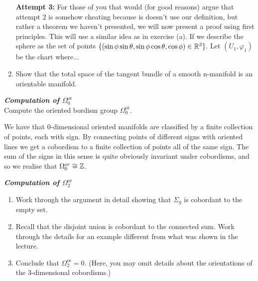 \begin{enumerate}[label=(\alph*)]
    \textbf{Attempt 3:} For those of you that would (for good reasons) argue that attempt 2 is somehow cheating because is doesn't use our definition, but rather a theorem we haven't presented, we will now present a proof using first principles. This will use a similar idea as in exercise (a). If we describe the sphere as the set of points $\{(\sin\phi \sin \theta ,\sin \phi \cos \theta, \cos \phi)\in \mathbb{R}^3 \} $. Let  $(U_1,\varphi_1)$ be the chart where...

    \item Show that the total space of the tangent bundle of a smooth n-manifold is an orientable
manifold. 
\end{enumerate}



\hspace{1cm}

\begin{exercise} \textbf{\textit{Computation of $\Omega_0^{\textrm{or}}$}}\\
Compute the oriented bordism group $\Omega_0^{\textrm{or}}$.
\end{exercise}

\noindent We have that $0$-dimensional oriented manifolds are classified by a finite collection of points, each with sign. By connecting points of different signs with oriented lines we get a cobordism to a finite collection of points all of the same sign. The sum of the signs in this sense is quite obviously invariant under cobordisms, and so we realise that $\Omega_0^{or}\cong \mathbb{Z}$.

\hspace{1cm}

\begin{exercise} \textbf{\textit{Computation of $\Omega_2^{\textrm{or}}$}}
	\begin{enumerate}[label=(\alph*)]
		\item Work through the argument in detail showing that \(\Sigma_g\) is cobordant to the empty
        set.
		\item Recall that the disjoint union is cobordant to the connected sum. Work through
        the details for an example different from what was shown in the lecture.
		\item Conclude that \(\Omega_2^{\textrm{or}} = 0\). (Here, you may omit details about the orientations of the
        3-dimensional cobordisms.)
	\end{enumerate}
\end{exercise}

